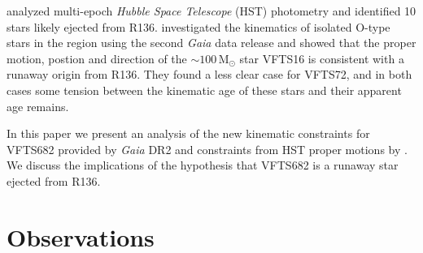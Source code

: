 \documentclass[a4paper,fleqn,usenatbib]{mnras}
\newcommand{\Msun}{{\,\mathrm{M}_\odot}}
\begin{document}
\citet{platais:15,platais:18} analyzed multi-epoch \emph{Hubble Space
  Telescope} (HST) photometry and identified 10 stars likely ejected
from R136. \citet{lennon:18} investigated the kinematics of  isolated
O-type stars in the region using the second \emph{Gaia} data release
\cite[DR2,][]{gaia:16,brown:18} and showed that the proper motion,
postion and direction of the $\sim$$100\Msun$ star VFTS16 is consistent
with a runaway origin from R136. They found a less clear case for
VFTS72, and in both cases some tension between the kinematic age of
these stars and their apparent age remains. 



In this paper we present an analysis of the new kinematic
constraints for VFTS682 provided by \emph{Gaia} DR2 and constraints
from HST proper motions  by \citet{platais:18}.   We discuss the
implications of the hypothesis that VFTS682 is a runaway star
ejected from R136.



\vspace*{-20pt}
\section{Observations}
\label{sec:sample}
\end{document}
